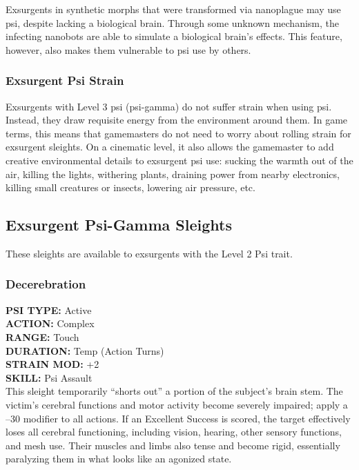 Exsurgents in synthetic morphs that were transformed 
via nanoplague may use psi, despite lacking a biological
brain. Through some unknown mechanism, the
infecting nanobots are able to simulate a biological 
brain's effects. This feature, however, also makes them 
vulnerable to psi use by others.

\subsubsection{Exsurgent Psi Strain}

Exsurgents with Level 3 psi (psi-gamma) do not suffer 
strain when using psi. Instead, they draw requisite 
energy from the environment around them. In game 
terms, this means that gamemasters do not need to 
worry about rolling strain for exsurgent sleights. On a 
cinematic level, it also allows the gamemaster to add creative
environmental details to exsurgent psi use: sucking
the warmth out of the air, killing the lights, withering 
plants, draining power from nearby electronics, killing 
small creatures or insects, lowering air pressure, etc. 

\subsection{Exsurgent Psi-Gamma Sleights }

These sleights are available to exsurgents with the 
Level 2 Psi trait.

\subsubsection{Decerebration }
\textbf{PSI TYPE:} Active \\
\textbf{ACTION:} Complex \\
\textbf{RANGE:} Touch \\
\textbf{DURATION:} Temp (Action Turns) \\
\textbf{STRAIN MOD:} +2 \\
\textbf{SKILL:} Psi Assault \\
This sleight temporarily ``shorts out'' a portion of the 
subject's brain stem. The victim's cerebral functions 
and motor activity become severely impaired; apply 
a –30 modifier to all actions. If an Excellent Success
is scored, the target effectively loses all cerebral
functioning, including vision, hearing, other sensory 
functions, and mesh use. Their muscles and limbs also 
tense and become rigid, essentially paralyzing them in 
what looks like an agonized state.

